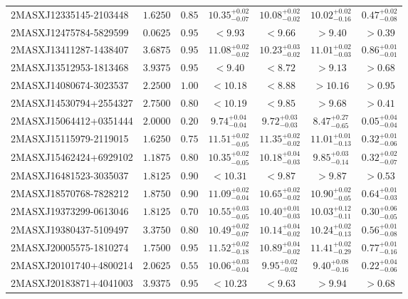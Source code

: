 \documentclass[onecolumn]{mn2e}
\begin{document}
{\begin{center}
\begin{longtable}{lcccccc}
2MASXJ12335145-2103448 & $1.6250$ & $0.85$ & $10.35_{-0.07}^{+0.02}$ & $10.08_{-0.02}^{+0.02}$ & $10.02_{-0.16}^{+0.02}$ &$0.47_{-0.08}^{+0.02}$ \\
2MASXJ12475784-5829599 & $0.0625$ & $0.95$ & $<9.93$ & $<9.66$ & $>9.40$ &$>0.39$ \\
2MASXJ13411287-1438407 & $3.6875$ & $0.95$ & $11.08_{-0.02}^{+0.02}$ & $10.23_{-0.02}^{+0.03}$ & $11.01_{-0.03}^{+0.02}$ &$0.86_{-0.01}^{+0.01}$ \\
2MASXJ13512953-1813468 & $3.9375$ & $0.95$ & $<9.40$ & $<8.72$ & $>9.13$ &$>0.68$ \\
2MASXJ14080674-3023537 & $2.2500$ & $1.00$ & $<10.18$ & $<8.88$ & $>10.16$ &$>0.95$ \\
2MASXJ14530794+2554327 & $2.7500$ & $0.80$ & $<10.19$ & $<9.85$ & $>9.68$ &$>0.41$ \\
2MASXJ15064412+0351444 & $2.0000$ & $0.20$ & $9.74_{-0.04}^{+0.04}$ & $9.72_{-0.03}^{+0.03}$ & $8.47_{-0.65}^{+0.27}$ &$0.05_{-0.04}^{+0.04}$ \\
2MASXJ15115979-2119015 & $1.6250$ & $0.75$ & $11.51_{-0.05}^{+0.02}$ & $11.35_{-0.02}^{+0.02}$ & $11.01_{-0.13}^{+0.01}$ &$0.32_{-0.06}^{+0.01}$ \\
2MASXJ15462424+6929102 & $1.1875$ & $0.80$ & $10.35_{-0.05}^{+0.02}$ & $10.18_{-0.03}^{+0.04}$ & $9.85_{-0.14}^{+0.03}$ &$0.32_{-0.07}^{+0.02}$ \\
2MASXJ16481523-3035037 & $1.8125$ & $0.90$ & $<10.31$ & $<9.87$ & $>9.87$ &$>0.53$ \\
2MASXJ18570768-7828212 & $1.8750$ & $0.90$ & $11.09_{-0.04}^{+0.02}$ & $10.65_{-0.02}^{+0.02}$ & $10.90_{-0.05}^{+0.02}$ &$0.64_{-0.03}^{+0.01}$ \\
2MASXJ19373299-0613046 & $1.8125$ & $0.70$ & $10.55_{-0.05}^{+0.03}$ & $10.40_{-0.03}^{+0.01}$ & $10.03_{-0.11}^{+0.12}$ &$0.30_{-0.05}^{+0.06}$ \\
2MASXJ19380437-5109497 & $3.3750$ & $0.80$ & $10.49_{-0.07}^{+0.02}$ & $10.14_{-0.02}^{+0.04}$ & $10.24_{-0.13}^{+0.02}$ &$0.56_{-0.08}^{+0.01}$ \\
2MASXJ20005575-1810274 & $1.7500$ & $0.95$ & $11.52_{-0.18}^{+0.02}$ & $10.89_{-0.02}^{+0.04}$ & $11.41_{-0.29}^{+0.02}$ &$0.77_{-0.16}^{+0.01}$ \\
2MASXJ20101740+4800214 & $2.0625$ & $0.55$ & $10.06_{-0.04}^{+0.03}$ & $9.95_{-0.02}^{+0.02}$ & $9.40_{-0.16}^{+0.08}$ &$0.22_{-0.06}^{+0.04}$ \\
2MASXJ20183871+4041003 & $3.9375$ & $0.95$ & $<10.23$ & $<9.63$ & $>9.94$ &$>0.68$ \\

\end{longtable}
\end{center}}
\end{document}

